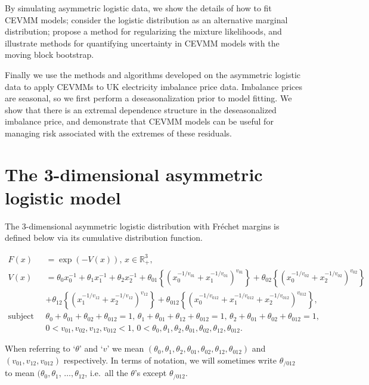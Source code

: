 \documentclass[11pt,twoside,openany]{book}
\newcommand{\R}{\mathbb{R}}
\numberwithin{Theorem}{chapter}
\numberwithin{Definition}{chapter}
\numberwithin{Lemma}{chapter}
\numberwithin{Algorithm}{chapter}
\numberwithin{equation}{chapter}
\begin{document}
By simulating asymmetric logistic data, we show the details of how to fit CEVMM
models; consider the logistic distribution as an alternative marginal
distribution; propose a method for regularizing the mixture likelihoods, and
illustrate methods for quantifying uncertainty in CEVMM models with the
moving block bootstrap.

Finally we use the methods and algorithms developed
on the asymmetric logistic data to apply CEVMMs
to UK electricity imbalance price data.
Imbalance prices are seasonal, so we first perform a deseasonalization
prior to model fitting. We show that there is an extremal dependence structure
in the deseasonalized imbalance price, and demonstrate that
CEVMM models can be useful for managing risk associated with the extremes of
these residuals.

\section{The 3-dimensional asymmetric logistic model}\label{sec:asymlog}

The 3-dimensional asymmetric logistic distribution with Fréchet margins is
defined below via its cumulative distribution function.

\begin{equation}
  \label{eq:3dimasslog}
  \begin{split}
  F(x) &= \exp\left(-V(x)\right),\, x \in \R_{+}^3,\\
V(x) &= \theta_0 x_0^{-1} + \theta_1 x_1^{-1} + \theta_2 x_2^{-1}
     +\theta_{01}\left\{(x_0^{-1/v_{01}} + x_1^{-1/v_{01}})^{v_{01}}\right\}
+\theta_{02}\left\{(x_0^{-1/v_{02}} + x_2^{-1/v_{02}})^{v_{02}}\right\}\\
     &+\theta_{12}\left\{ (x_1^{-1/v_{12}} + x_2^{-1/v_{12}})^{v_{12}}\right\}
+\theta_{012}\left\{(x_0^{-1/v_{012}} + x_1^{-1/v_{012}} + x_2^{-1/v_{012}})^{v_{012}}\right\},\\
\text{subject to  }\;
&\theta_0+\theta_{01}+\theta_{02}+\theta_{012}=1,\,
\theta_1+\theta_{01}+\theta_{12}+\theta_{012}=1,\,
\theta_2+\theta_{01}+\theta_{02}+\theta_{012}=1,\\
&0<v_{01},v_{02},v_{12},v_{012} < 1,\,
0<\theta_0,\theta_1,\theta_2,\theta_{01},\theta_{02},\theta_{12},\theta_{012}.
\end{split}
\end{equation}

When referring to `$\theta$' and `$v$' we mean
$(\theta_0,\theta_1,\theta_2,\theta_{01},\theta_{02},\theta_{12},\theta_{012})$
and $(v_{01}, v_{12}, v_{012})$ respectively. In terms of notation,
we will sometimes write $\theta_{/012}$ to mean $(\theta_0,\theta_1,\,\ldots,\theta_{12}$,
i.e.\ all the $\theta$'s except $\theta_{/012}$.
\end{document}
